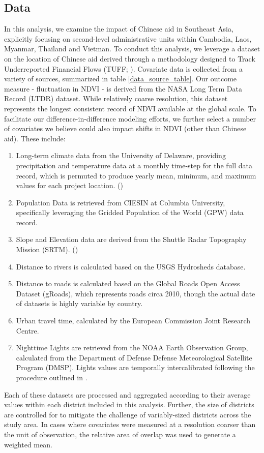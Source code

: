 \subsection{Data}

In this analysis, we examine the impact of Chinese aid in Southeast Asia, explicitly focusing on second-level administrative units within Cambodia, Laos, Myanmar, Thailand and Vietman.
To conduct this analysis, we leverage a dataset on the location of Chinese aid derived through a methodology designed to Track Underreported Financial Flows (TUFF; \cite{strange_tracking_2015}).
Covariate data is collected from a variety of sources, summarized in table \ref{data_source_table}.
Our outcome measure - fluctuation in NDVI - is derived from the NASA Long Term Data Record (LTDR) dataset.
While relatively coarse resolution, this dataset represents the longest consistent record of NDVI available at the global scale.
To facilitate our difference-in-difference modeling efforts, we further select a number of covariates we believe could also impact shifts in NDVI (other than Chinese aid).
These include:
\begin{enumerate}
\item{Long-term climate data from the University of Delaware, providing precipitation and temperature data at a monthly time-step for the full data record, which is permuted to produce yearly mean, minimum, and maximum values for each project location. (\cite{willmott_terrestrial_2001})}
\item{Population Data is retrieved from CIESIN at Columbia University, specifically leveraging the Gridded Population of the World (GPW) data record.}
\item{Slope and Elevation data are derived from the Shuttle Radar Topography Mission (SRTM). (\cite{farr_shuttle_2007})}
\item{Distance to rivers is calculated based on the USGS Hydrosheds database.}
\item{Distance to roads is calculated based on the Global Roads Open Access Dataset (gRoads), which represents roads circa 2010, though the actual date of datasets is highly variable by country.}
\item{Urban travel time, calculated by the European Commission Joint Research Centre.}
\item{Nighttime Lights are retrieved from the NOAA Earth Observation Group, calculated from the Department of Defense Defense Meteorological Satellite Program (DMSP).  Lights values are temporally intercalibrated following the procedure outlined in \cite{weng_global_2014}.}
\end{enumerate}
Each of these datasets are processed and aggregated according to their average values within each district included in this analysis.  
Further, the size of districts are controlled for to mitigate the challenge of variably-sized districts across the study area.
In cases where covariates were measured at a resolution coarser than the unit of observation, the relative area of overlap was used to generate a weighted mean.









